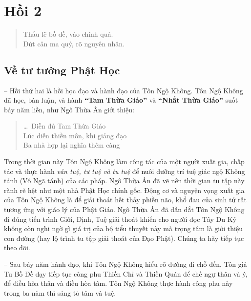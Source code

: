 \chapter{Hồi 2} %
\label{cha:hoi_2}

\begin{verse}
\begin{itshape}
Thấu lẽ bồ đề, vào chính quả.\\
Dứt căn ma quỷ, rõ nguyên nhân.
\end{itshape}
\end{verse}

\section{Về tư tưởng Phật Học} %
\label{sec:2_tu_tuong_phat_hoc}

-- Hồi thứ hai là hồi học đạo và hành đạo của Tôn Ngộ Không. Tôn Ngộ Không đã học, bàn luận, và hành {\bf ``Tam Thừa Giáo''} và {\bf ``Nhất Thừa Giáo''} suốt bảy năm liền, như Ngô Thừa Ân giới thiệu:

\begin{verse}
\begin{itshape}
\ldots ~Diễn đủ Tam Thừa Giáo\\
Lúc diễn thiền môn, khi giảng đạo\\
Ba nhà hợp lại nghĩa thêm càng
\end{itshape}
\end{verse}

Trong thời gian này Tôn Ngộ Không làm công tác của một người xuất gia, chấp tác và thực hành \emph{văn tuệ, tư tuệ và tu tuệ} để nuôi dưỡng trí tuệ giác ngộ Không tánh (Vô Ngã tánh) của các pháp. Ngô Thừa Ân đã vẽ nên thời gian tu tập này rành rẽ hệt như một nhà Phật Học chính gốc. Động cơ và nguyện vọng xuất gia của Tôn Ngộ Không là để giải thoát hết thảy phiền não, khổ đau của sinh tử rất tương ứng với giáo lý của Phật Giáo. Ngô Thừa Ân đã dẫn dắt Tôn Ngộ Không đi đúng tiến trình Giới, Định, Tuệ giải thoát khiến cho người đọc Tây Du Ký không còn nghi ngờ gì giá trị của bộ tiểu thuyết này mà trọng tâm là giới thiệu con đường (hay lộ trình tu tập giải thoát của Đạo Phật). Chúng ta hãy tiếp tục theo dõi.

-- Sau bảy năm hành đạo, khi Tôn Ngộ Không hiểu rõ đường đi chỗ đến, Tôn giả Tu Bồ Đề dạy tiếp tục công phu Thiền Chỉ và Thiền Quán để chế ngự thân và ý, để điều hòa thân và điều hòa tâm. Tôn Ngộ Không thực hành công phu này trong ba năm thì sáng tỏ tâm và tuệ.

